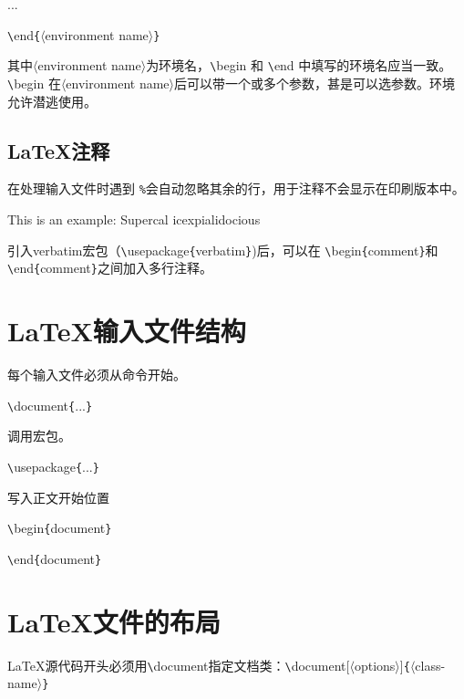 \documentclass[UTF8]{ctexart}
\begin{document}
...

\texttt{\textbackslash}end\texttt{\{}$\langle$environment\,\,name$\rangle$\texttt{\}}

其中$\langle$environment\,\,name$\rangle$为环境名，\texttt{\textbackslash}begin 和 \texttt{\textbackslash}end 中填写的环境名应当一致。\texttt{\textbackslash}begin 在$\langle$environment\,\,name$\rangle$后可以带一个或多个参数，甚是可以选参数。环境允许潜逃使用。
\subsection{\LaTeX 注释}
在处理输入文件时遇到 \texttt{\%}会自动忽略其余的行，用于注释不会显示在印刷版本中。

This is an %
example: Supercal%
icexpialidocious

引入verbatim宏包（\texttt{\textbackslash}usepackage\texttt{\{}verbatim\texttt{\}})后，可以在 \texttt{\textbackslash}begin\texttt{\{}comment\texttt{\}}和 \texttt{\textbackslash}end\texttt{\{}comment\texttt{\}}之间加入多行注释。
\section{\LaTeX 输入文件结构}
每个输入文件必须从命令开始。

\texttt{\textbackslash}document\texttt{\{}...\texttt{\}}

调用宏包。

\texttt{\textbackslash}usepackage\texttt{\{}...\texttt{\}}

写入正文开始位置

\texttt{\textbackslash}begin\texttt{\{}document\texttt{\}}

\texttt{\textbackslash}end\texttt{\{}document\texttt{\}}
\section{\LaTeX 文件的布局}
\LaTeX 源代码开头必须用\texttt{\textbackslash}document指定文档类：\texttt{\textbackslash}document[$\langle$options$\rangle$]\texttt{\{}$\langle$class-name$\rangle$\texttt{\}}
\end{document}
